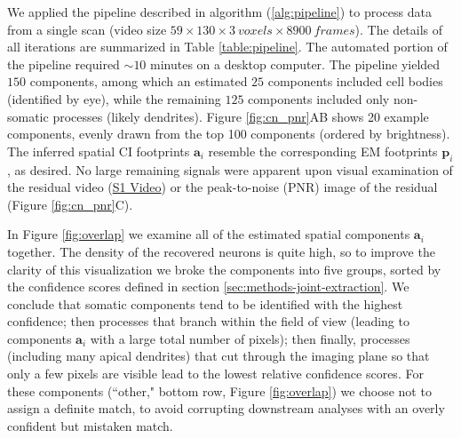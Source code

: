 \documentclass[10pt,letterpaper]{article}
\def \videoOneURL{https://www.dropbox.com/s/0ph27nsx5fxcc1b/demixing_scan_1_201_9100.avi?dl=0}
\begin{document}
{We applied the pipeline described in algorithm (\ref{alg:pipeline}) to process data from a single scan (video size $59\times 130\times 3~ voxels \times 8900 ~frames$). The details of all iterations are summarized in Table \ref{table:pipeline}.  The automated portion of the pipeline required $\sim 10$ minutes on a desktop computer.
The pipeline yielded $150$ components, among which an estimated $25$ components included cell bodies (identified by eye), while the remaining $125$ components included only  non-somatic processes (likely dendrites). 
Figure \ref{fig:cn_pnr}AB shows 20 example components, evenly drawn from the top 100 components (ordered by brightness). The inferred spatial CI footprints $\bm{a}_i$ resemble the corresponding EM footprints $\bm{p}_i$, as desired.  No large remaining signals were apparent upon visual examination of the residual video (\href{\videoOneURL}{S1 Video}) or the peak-to-noise (PNR) image of the residual (Figure \ref{fig:cn_pnr}C).  

In Figure \ref{fig:overlap} we examine all of the estimated spatial components $\bm{a}_i$ together.  The density of the recovered neurons is quite high, so to improve the clarity of this visualization we broke the components into five groups, sorted by the confidence scores defined in section \ref{sec:methods-joint-extraction}.  We conclude that somatic components tend to be identified with the highest confidence; then processes that branch within the field of view (leading to components $\bm{a}_i$ with a large total number of pixels); then finally, processes (including many apical dendrites) that cut through the imaging plane so that only a few pixels are visible lead to the lowest relative confidence scores.  For these components (``other," bottom row, Figure \ref{fig:overlap}) we choose not to assign a definite match, to avoid corrupting downstream analyses with an overly confident but mistaken match.

}
\end{document}
